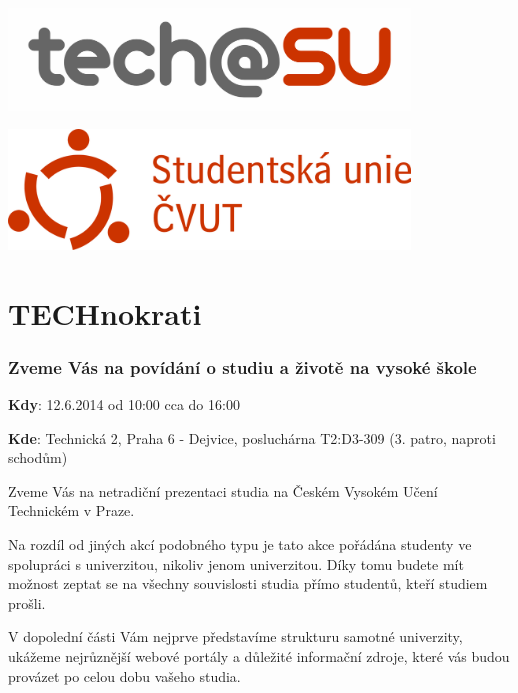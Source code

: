\documentclass[12pt]{extarticle}[10.3.2013]
\author{Tomáš Kukrál}
\newcommand{\B}[1]{\textbf{{#1}}}
\begin{document}
\pagestyle{empty}

\begin{minipage}[c]{0.5\textwidth}
\begin{center}
	{\includegraphics[width=0.8\textwidth]{logo-obdelnik.png}}
\end{center}
\end{minipage}
\begin{minipage}[c]{0.5\textwidth}
\begin{center}
	{\includegraphics[width=0.8\textwidth]{logo-su.png}}
\end{center}
\end{minipage}

\part*{TECHnokrati}
\section*{Zveme Vás na povídání o studiu a životě na vysoké škole}

\B{Kdy}: 12.6.2014 od 10:00 cca do 16:00

\B{Kde}: Technická 2, Praha 6 - Dejvice, posluchárna T2:D3-309 (3. patro,
naproti schodům)



\vspace{1em}

Zveme Vás na netradiční prezentaci studia na Českém Vysokém Učení Technickém v Praze.

Na rozdíl od jiných akcí podobného typu je tato akce pořádána studenty
ve spolupráci s univerzitou, nikoliv jenom univerzitou. Díky tomu budete mít možnost zeptat se na všechny
souvislosti studia přímo studentů, kteří studiem prošli.

V dopolední části Vám nejprve představíme strukturu samotné univerzity,
ukážeme nejrůznější webové portály a důležité informační zdroje,
které vás budou provázet po celou dobu vašeho studia. 
\end{document}
